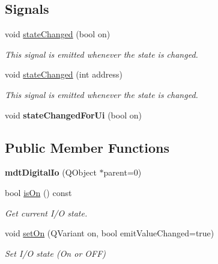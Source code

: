 \subsection*{Signals}
\begin{DoxyCompactItemize}
\item 
\hypertarget{classmdt_digital_io_a69c20119906682c0bd90833598127328}{
void \hyperlink{classmdt_digital_io_a69c20119906682c0bd90833598127328}{stateChanged} (bool on)}
\label{classmdt_digital_io_a69c20119906682c0bd90833598127328}

\begin{DoxyCompactList}\small\item\em This signal is emitted whenever the state is changed. \end{DoxyCompactList}\item 
void \hyperlink{classmdt_digital_io_aa23bf21e08f0b0d82e430e88ac03aba8}{stateChanged} (int address)
\begin{DoxyCompactList}\small\item\em This signal is emitted whenever the state is changed. \end{DoxyCompactList}\item 
\hypertarget{classmdt_digital_io_ab50657b37b4915bd142aa0f22f45fd41}{
void {\bfseries stateChangedForUi} (bool on)}
\label{classmdt_digital_io_ab50657b37b4915bd142aa0f22f45fd41}

\end{DoxyCompactItemize}
\subsection*{Public Member Functions}
\begin{DoxyCompactItemize}
\item 
\hypertarget{classmdt_digital_io_ab5cca7698845624d99f94052d87790bb}{
{\bfseries mdtDigitalIo} (QObject $\ast$parent=0)}
\label{classmdt_digital_io_ab5cca7698845624d99f94052d87790bb}

\item 
\hypertarget{classmdt_digital_io_a2bd703bced41720f1569c4e7b26059a1}{
bool \hyperlink{classmdt_digital_io_a2bd703bced41720f1569c4e7b26059a1}{isOn} () const }
\label{classmdt_digital_io_a2bd703bced41720f1569c4e7b26059a1}

\begin{DoxyCompactList}\small\item\em Get current I/O state. \end{DoxyCompactList}\item 
void \hyperlink{classmdt_digital_io_a0a9ae15796ca74638af2d6c5addfdb6f}{setOn} (QVariant on, bool emitValueChanged=true)
\begin{DoxyCompactList}\small\item\em Set I/O state (On or OFF) \end{DoxyCompactList}\end{DoxyCompactItemize}


